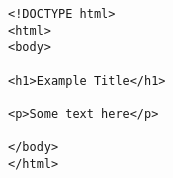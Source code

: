 \begin{lstlisting}[frame=single, basicstyle=\small]
<!DOCTYPE html>
<html>
<body>

<h1>Example Title</h1>

<p>Some text here</p>

</body>
</html>
\end{lstlisting}
